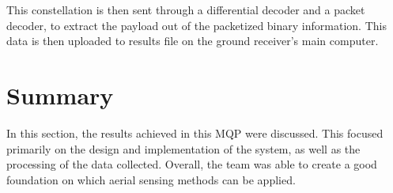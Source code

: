 This constellation is then sent through a differential decoder and a packet decoder, to extract the payload out of the packetized binary information. This data is then uploaded to results file on the ground receiver’s main computer.

\section{Summary}
In this section, the results achieved in this MQP were discussed. This focused primarily on the design and implementation of the system, as well as the processing of the data collected. Overall, the team was able to create a good foundation on which aerial sensing methods can be applied.
